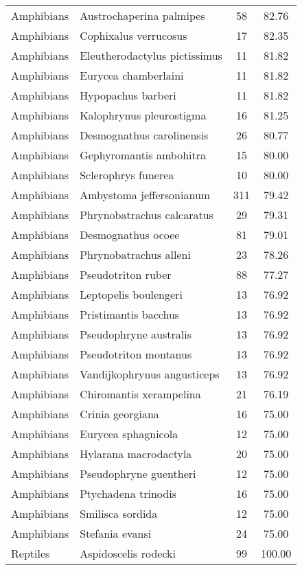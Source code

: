 \begin{longtable}{llcc}
  Amphibians & Austrochaperina palmipes &  58 & 82.76 \\ 
  Amphibians & Cophixalus verrucosus &  17 & 82.35 \\ 
  Amphibians & Eleutherodactylus pictissimus &  11 & 81.82 \\ 
  Amphibians & Eurycea chamberlaini &  11 & 81.82 \\ 
  Amphibians & Hypopachus barberi &  11 & 81.82 \\ 
  Amphibians & Kalophrynus pleurostigma &  16 & 81.25 \\ 
  Amphibians & Desmognathus carolinensis &  26 & 80.77 \\ 
  Amphibians & Gephyromantis ambohitra &  15 & 80.00 \\ 
  Amphibians & Sclerophrys funerea &  10 & 80.00 \\ 
  Amphibians & Ambystoma jeffersonianum & 311 & 79.42 \\ 
  Amphibians & Phrynobatrachus calcaratus &  29 & 79.31 \\ 
  Amphibians & Desmognathus ocoee &  81 & 79.01 \\ 
  Amphibians & Phrynobatrachus alleni &  23 & 78.26 \\ 
  Amphibians & Pseudotriton ruber &  88 & 77.27 \\ 
  Amphibians & Leptopelis boulengeri &  13 & 76.92 \\ 
  Amphibians & Pristimantis bacchus &  13 & 76.92 \\ 
  Amphibians & Pseudophryne australis &  13 & 76.92 \\ 
  Amphibians & Pseudotriton montanus &  13 & 76.92 \\ 
  Amphibians & Vandijkophrynus angusticeps &  13 & 76.92 \\ 
  Amphibians & Chiromantis xerampelina &  21 & 76.19 \\ 
  Amphibians & Crinia georgiana &  16 & 75.00 \\ 
  Amphibians & Eurycea sphagnicola &  12 & 75.00 \\ 
  Amphibians & Hylarana macrodactyla &  20 & 75.00 \\ 
  Amphibians & Pseudophryne guentheri &  12 & 75.00 \\ 
  Amphibians & Ptychadena trinodis &  16 & 75.00 \\ 
  Amphibians & Smilisca sordida &  12 & 75.00 \\ 
  Amphibians & Stefania evansi &  24 & 75.00 \\ 
  Reptiles & Aspidoscelis rodecki &  99 & 100.00 \\ 

\end{longtable}

